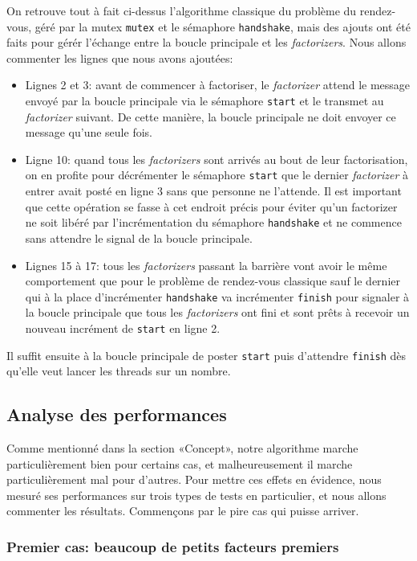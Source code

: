 \documentclass[a4paper,10pt]{article}
\begin{document}
On retrouve tout à fait ci-dessus l'algorithme classique du problème du rendez-vous, géré par la mutex \texttt{mutex} et le sémaphore \texttt{handshake}, mais des ajouts ont été faits pour gérér l'échange entre la boucle principale et les \emph{factorizers}. Nous allons commenter les lignes que nous avons ajoutées:
\begin{itemize}
    \item Lignes 2 et 3: avant de commencer à factoriser, le \emph{factorizer} attend le message envoyé par la boucle principale via le sémaphore \texttt{start} et le transmet au \emph{factorizer} suivant. De cette manière, la boucle principale ne doit envoyer ce message qu'une seule fois.
    \item Ligne 10: quand tous les \emph{factorizers} sont arrivés au bout de leur factorisation, on en profite pour décrémenter le sémaphore \texttt{start} que le dernier \emph{factorizer} à entrer avait posté en ligne 3 sans que personne ne l'attende. Il est important que cette opération se fasse à cet endroit précis pour éviter qu'un factorizer ne soit libéré par l'incrémentation du sémaphore \texttt{handshake} et ne commence sans attendre le signal de la boucle principale.
    \item Lignes 15 à 17: tous les \emph{factorizers} passant la barrière vont avoir le même comportement que pour le problème de rendez-vous classique sauf le dernier qui à la place d'incrémenter \texttt{handshake} va incrémenter \texttt{finish} pour signaler à la boucle principale que tous les \emph{factorizers} ont fini et sont prêts à recevoir un nouveau incrément de \texttt{start} en ligne 2.
\end{itemize}

Il suffit ensuite à la boucle principale de poster \texttt{start} puis d'attendre \texttt{finish} dès qu'elle veut lancer les threads sur un nombre.

\subsection*{Analyse des performances}

Comme mentionné dans la section «Concept», notre algorithme marche particulièrement bien pour certains cas, et malheureusement il marche particulièrement mal pour d'autres. Pour mettre ces effets en évidence, nous mesuré ses performances sur trois types de tests en particulier, et nous allons commenter les résultats. Commençons par le pire cas qui puisse arriver.

\subsubsection*{Premier cas: beaucoup de petits facteurs premiers}
\end{document}
